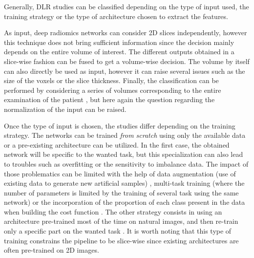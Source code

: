 \documentclass[]{article}
\begin{document}
Generally, DLR studies can be classified depending on the type of
input used, the training strategy or the type of architecture chosen to
extract the features.

As input, deep radiomics networks can consider 2D slices independently,
however this technique does not bring sufficient information since the
decision mainly depends on the entire volume of interest.
The different outputs obtained in a slice-wise fashion can be fused to
get a volume-wise decision. The volume by itself can also directly be
used as input, however it can raise several issues such as the size of
the voxels or the slice thickness. Finally, the classification can be
performed by considering a series of volumes corresponding to the entire
examination of the patient \cite{Shen2016}, but here
again the question regarding the normalization of the input can be
raised.

Once the type of input is chosen, the studies differ depending on the
training strategy. The networks can be trained \emph{from scratch} using
only the available data or a pre-existing architecture can be utilized.
In the first case, the obtained network will be specific to the wanted
task, but this specialization can also lead to troubles such as
overfitting or the sensitivity to imbalance data.
The impact of those problematics can be limited with the help of data
augmentation (use of existing data to generate new artificial samples) \cite{Kumar2017}, multi-task training (where the
number of parameters is limited by the training of several task using
the same network) or the
incorporation of the proportion of each class present in the data when
building the cost function \cite{Jamaludin2016}.
The other strategy consists in using an architecture pre-trained most of
the time on natural images, and then re-train only a specific part on
the wanted task \cite{Echaniz2017,Huynh2016,Paul2016}. It
is worth noting that this type of training constrains the pipeline to be
slice-wise since existing architectures are often pre-trained on 2D
images.\\
\end{document}
